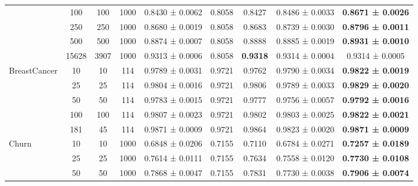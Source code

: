 \begin{table}
{\begin{tabular}[H]{@{}lcccccccc@{}}
                              & 100   & 100  & 1000 & 0.8430 ± 0.0062      & 0.8058               & 0.8427          & 0.8486 ± 0.0033          & \textbf{0.8671 ± 0.0026} \\
                              & 250   & 250  & 1000 & 0.8680 ± 0.0019      & 0.8058               & 0.8683          & 0.8739 ± 0.0030          & \textbf{0.8796 ± 0.0011} \\
                              & 500   & 500  & 1000 & 0.8874 ± 0.0007      & 0.8058               & 0.8888          & 0.8885 ± 0.0019          & \textbf{0.8931 ± 0.0010} \\
                              & 15628 & 3907 & 1000 & 0.9313 ± 0.0006      & 0.8058               & \textbf{0.9318} & 0.9314 ± 0.0004          & 0.9314 ± 0.0005          \\
                              \midrule
\multirow{5}{*}{BreastCancer} & 10    & 10   & 114  & 0.9789 ± 0.0031      & 0.9721               & 0.9762          & 0.9790 ± 0.0034          & \textbf{0.9822 ± 0.0019} \\
                              & 25    & 25   & 114  & 0.9804 ± 0.0016      & 0.9721               & 0.9806          & 0.9789 ± 0.0033          & \textbf{0.9829 ± 0.0020} \\
                              & 50    & 50   & 114  & 0.9783 ± 0.0015      & 0.9721               & 0.9777          & 0.9756 ± 0.0057          & \textbf{0.9792 ± 0.0016} \\
                              & 100   & 100  & 114  & 0.9807 ± 0.0023      & 0.9721               & 0.9802          & 0.9803 ± 0.0025          & \textbf{0.9822 ± 0.0021} \\
                              & 181   & 45   & 114  & 0.9871 ± 0.0009      & 0.9721               & 0.9864          & 0.9823 ± 0.0020          & \textbf{0.9871 ± 0.0009} \\
                              \midrule
\multirow{7}{*}{Churn}        & 10    & 10   & 1000 & 0.6848 ± 0.0206      & 0.7155               & 0.7110          & 0.6784 ± 0.0271          & \textbf{0.7257 ± 0.0189} \\
                              & 25    & 25   & 1000 & 0.7614 ± 0.0111      & 0.7155               & 0.7634          & 0.7558 ± 0.0120          & \textbf{0.7730 ± 0.0108} \\
                              & 50    & 50   & 1000 & 0.7868 ± 0.0047      & 0.7155               & 0.7831          & 0.7730 ± 0.0038          & \textbf{0.7906 ± 0.0074} \\

\end{tabular}}
\end{table}
